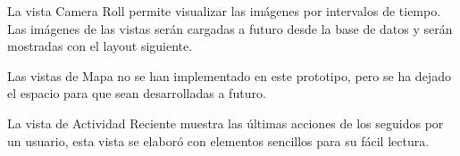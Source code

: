 \documentclass{memoria}
\begin{document}
La vista Camera Roll permite visualizar las imágenes por intervalos de tiempo. Las imágenes de las vistas serán cargadas a futuro desde la base de datos y serán mostradas con el layout siguiente.

\newpage

Las vistas de Mapa no se han implementado en este prototipo, pero se ha dejado el espacio para que sean desarrolladas a futuro.

La vista de Actividad Reciente muestra las últimas acciones de los seguidos por un usuario, esta vista se elaboró con elementos sencillos para su fácil lectura.
\end{document}
